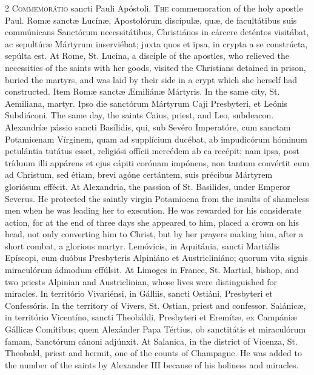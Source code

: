 \begin{paracol}{2}
\lettrine[lines=2]{C}{ommemorátio} sancti 
 Pauli Apóstoli.
\switchcolumn
{}
\lettrine[lines=2]{T}{he} commemoration of the holy 
 apostle Paul.
\switchcolumn*
{}
Romæ sanctæ Lucínæ, 
 Apostolórum discípulæ, quæ, de facultátibus suis commúnicans Sanctórum 
 necessitátibus, Christiános in cárcere deténtos visitábat, ac sepultúræ 
 Mártyrum inserviébat; juxta quos et ipsa, in crypta a se constrúcta, sepúlta 
 est.
\switchcolumn
{}
At Rome, St. Lucina, a disciple of 
 the apostles, who relieved the necessities of the saints with her goods, 
 visited the Christians detained in prison, buried the martyrs, and was laid 
 by their side in a crypt which she herself had constructed.
\switchcolumn*
{}
Item Romæ sanctæ 
 Æmiliánæ Mártyris.
\switchcolumn
{}
In the same city, St. Aemiliana, 
 martyr.
\switchcolumn*
{}
Ipso die sanctórum 
 Mártyrum Caji Presbyteri, et Leónis Subdiáconi.
\switchcolumn
{}
The same day, the saints Caius, 
 priest, and Leo, subdeacon.
\switchcolumn*
{}
Alexandríæ pássio 
 sancti Basílidis, qui, sub Sevéro Imperatóre, cum sanctam Potamiœnam 
 Vírginem, quam ad supplícium ducébat, ab impudicórum hóminum petulántia 
 tutátus esset, religiósi offícii mercédem ab ea recépit; nam ipsa, post 
 tríduum illi appárens et ejus cápiti corónam impónens, non tantum convértit 
 eum ad Christum, sed étiam, brevi agóne certántem, suis précibus Mártyrem 
 gloriósum effécit.
\switchcolumn
{}
At Alexandria, the passion of St. 
 Basilides, under Emperor Severus. He protected the saintly virgin 
 Potamioena from the insults of shameless men when he was leading her to 
 execution. He was rewarded for his considerate action, for at the end 
 of three days she appeared to him, placed a crown on his head, not only 
 converting him to Christ, but by her prayers making him, after a short 
 combat, a glorious martyr.
\switchcolumn*
{}
Lemóvicis, in Aquitánia, 
 sancti Martiális Epíscopi, cum duóbus Presbyteris Alpiniáno et 
 Austricliniáno; quorum vita signis miraculórum ádmodum effúlsit.
\switchcolumn
{}
At Limoges in France, St. Martial, 
 bishop, and two priests Alpinian and Austriclinian, whose lives were 
 distinguished for miracles.
\switchcolumn*
{}
In território 
 Vivariénsi, in Gálliis, sancti Ostiáni, Presbyteri et Confessóris.
\switchcolumn
{}
In the territory of Vivers, St. 
 Ostian, priest and confessor.
\switchcolumn*
{}
Salánicæ, in território 
 Vicentíno, sancti Theobáldi, Presbyteri et Eremítæ, ex Campániæ Gállicæ 
 Comítibus; quem Alexánder Papa Tértius, ob sanctitátis et miraculórum famam, 
 Sanctórum cánoni adjúnxit.
\switchcolumn
{}
At Salanica, in the district of 
 Vicenza, St. Theobald, priest and hermit, one of the counts of Champagne. 
 He was added to the number of the saints by Alexander III because of his 
 holiness and miracles.
\switchcolumn*
{}
\end{paracol}
